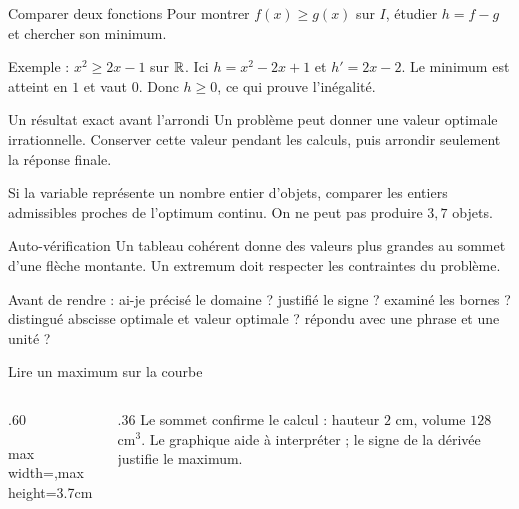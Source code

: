 \documentclass[aspectratio=169,12pt]{beamer}
\begin{document}
\renewcommand{\slidekind}{COMPRENDRE}
\begin{frame}[t,fragile]{Comparer deux fonctions}
Pour montrer $f(x)\ge g(x)$ sur $I$, étudier $h=f-g$ et chercher son minimum.\medskip\par Exemple : $x^2\ge2x-1$ sur $\mathbb{R}$. Ici $h=x^2-2x+1$ et $h\prime=2x-2$. Le minimum est atteint en $1$ et vaut $0$. Donc $h\ge0$, ce qui prouve l’inégalité.
\end{frame}
\renewcommand{\slidekind}{COMPRENDRE}
\begin{frame}[t,fragile]{Un résultat exact avant l’arrondi}
Un problème peut donner une valeur optimale irrationnelle. Conserver cette valeur pendant les calculs, puis arrondir seulement la réponse finale.\medskip\par Si la variable représente un nombre entier d’objets, comparer les entiers admissibles proches de l’optimum continu. On ne peut pas produire $3,7$ objets.
\end{frame}
\renewcommand{\slidekind}{À RETENIR}
\begin{frame}[t,fragile]{Auto-vérification}
Un tableau cohérent donne des valeurs plus grandes au sommet d’une flèche montante. Un extremum doit respecter les contraintes du problème.\medskip\par Avant de rendre : ai-je précisé le domaine ? justifié le signe ? examiné les bornes ? distingué abscisse optimale et valeur optimale ? répondu avec une phrase et une unité ?
\end{frame}
\renewcommand{\slidekind}{COMPRENDRE}
\begin{frame}[t,fragile]{Lire un maximum sur la courbe}
\begin{columns}[c,onlytextwidth]\begin{column}{.60\textwidth}\centering\begin{adjustbox}{max width=\linewidth,max height=3.7cm}\end{adjustbox}\end{column}\begin{column}{.36\textwidth} Le sommet confirme le calcul : hauteur $2$ cm, volume $128$ cm$^3$. Le graphique aide à interpréter ; le signe de la dérivée justifie le maximum.\end{column}\end{columns}
\end{frame}
\end{document}
